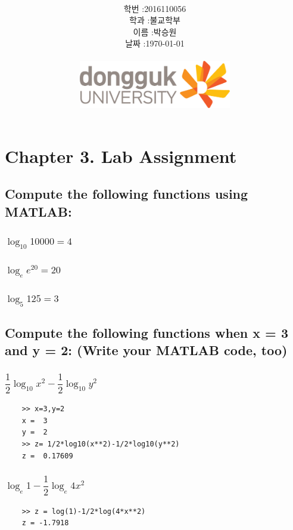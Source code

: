 \documentclass[12pt,a4paper]{article}
\title{
	\centering
	\pgfornament[width=12cm,color=teal]{84}\\
	\vspace{1cm}
	\fontsize{50}{50} \selectfont {정보통신 수학 및 실습\\Lab assignment}\\
		\pgfornament[width=12cm,color=teal]{88}\\
	\vfill}
\author{
	\LARGE
	\begin{tabular}{rl}
		\hline
		학번 : & 2016110056\\ 
		학과 : & 불교학부 \\
		이름 : & 박승원\\
		날짜 : & \today\\
		\hline
	\end{tabular}\vspace{1cm}
	\\
\includegraphics[width=0.5\textwidth]{logo.jpg}
	}
\date{}
\begin{document}
\maketitle
{}
\noindent
\lstset{language=matlab, columns=flexible, tabsize=4, frame=shadowbox, showstringspaces=false, breaklines=true, upquote=true, basicstyle=\normalsize}

\renewcommand{\thesubsubsection}{\alph{subsubsection})}
\renewcommand{\thesubsection}{\arabic{subsection}.}
\newpage
\section*{Chapter 3. Lab Assignment}
\subsection{Compute the following functions using MATLAB:} 

\subsubsection{$\log_{10}{10000}=4$}

\subsubsection{$\log_e{e^{20}}=20$}
\subsubsection{$\log_{5}{125}=3$}

\subsection{Compute the following functions when x = 3 and y = 2: (Write your MATLAB code, too)} 

\subsubsection{$\dfrac{1}{2}\log_{10}x^2-\dfrac{1}{2}\log_{10}y^2$}
\begin{lstlisting}
	>> x=3,y=2
	x =  3
	y =  2
	>> z= 1/2*log10(x**2)-1/2*log10(y**2)
	z =  0.17609
\end{lstlisting}
\subsubsection{$\log_e1-\dfrac{1}{2}\log_e4x^2$}
\begin{lstlisting}
	>> z = log(1)-1/2*log(4*x**2)
	z = -1.7918
\end{lstlisting}
\end{document}
